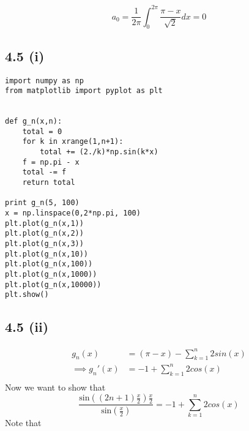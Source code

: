 \documentclass[letterpaper,12pt]{article}
\theoremstyle{definition}
\begin{document}
\[a_0 = \frac{1}{2\pi} \int^{2  \pi}_{0} \frac{\pi - x}{\sqrt 2} dx = 0\]

\subsection*{4.5 (i)}
\begin{lstlisting}
import numpy as np
from matplotlib import pyplot as plt


def g_n(x,n):
    total = 0
    for k in xrange(1,n+1):
        total += (2./k)*np.sin(k*x)
    f = np.pi - x
    total -= f
    return total

print g_n(5, 100)
x = np.linspace(0,2*np.pi, 100)
plt.plot(g_n(x,1))
plt.plot(g_n(x,2))
plt.plot(g_n(x,3))
plt.plot(g_n(x,10))
plt.plot(g_n(x,100))
plt.plot(g_n(x,1000))
plt.plot(g_n(x,10000))
plt.show()
\end{lstlisting}

\subsection*{4.5 (ii)}
\begin{align*}
    g_n(x) &= (\pi - x) - \sum^{n}_{k=1} 2 sin(x) \\
    \implies g_n'(x) &= -1 + \sum^{n}_{k=1} 2 cos(x) \\
\end{align*}
Now we want to show that 
    \[\frac{\text{sin} \left( (2n+1)\frac{x}{2} \right)\frac{x}{2} }{\text{sin} (\frac{x}{2}) }  =-1 + \sum^{n}_{k=1} 2 cos(x)\]
Note that 

\begin{align*}
\end{align*}
\end{document}
